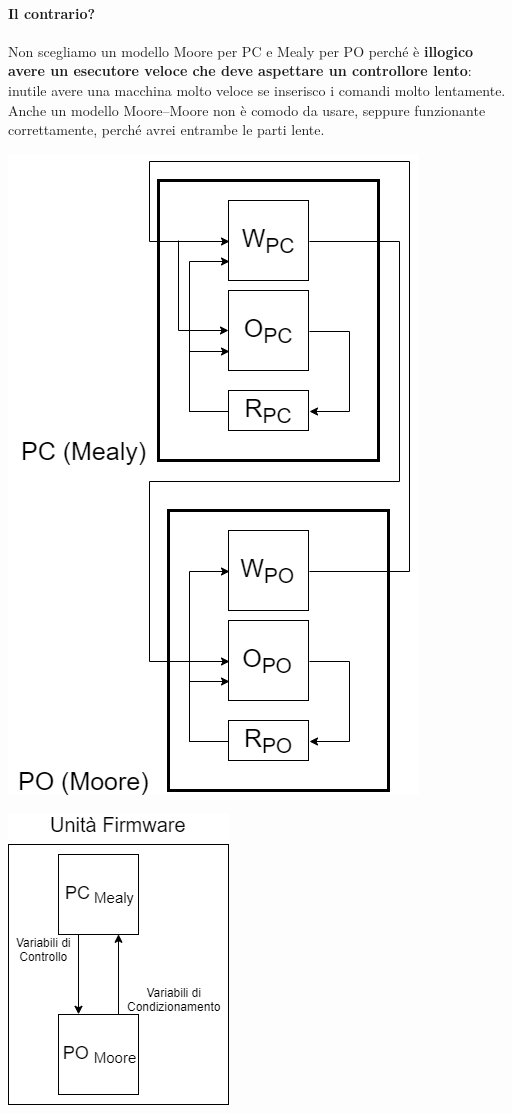 \documentclass[10pt]{report}
\begin{document}
\paragraph{Il contrario?} Non scegliamo un modello Moore per PC e Mealy per PO perché è \textbf{illogico avere un esecutore veloce che deve aspettare un controllore lento}: inutile avere una macchina molto veloce se inserisco i comandi molto lentamente.\\
Anche un modello Moore--Moore non è comodo da usare, seppure funzionante correttamente, perché avrei entrambe le parti lente.
\pagebreak
\begin{multicols}{2}
	\begin{center}
		\includegraphics[scale=0.5]{pcposchema.png}
	\end{center}
	\columnbreak
	\begin{center}
		\includegraphics[scale=1]{ufschema.png}
	\end{center}
\end{multicols}
\end{document}
